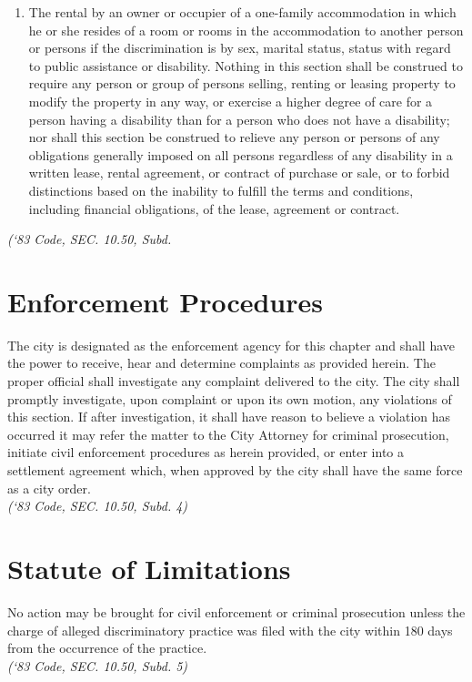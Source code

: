 \begin{enumerate}[{\indent}A)]
\begin{enumerate}
        \item The rental by an owner or occupier of a one-family accommodation in which he or she resides of a room or rooms in the accommodation to another person or persons if the discrimination is by sex, marital status, status with regard to public assistance or disability. Nothing in this section shall be construed to require any person or group of persons selling, renting or leasing property to modify the property in any way, or exercise a higher degree of care for a person having a disability than for a person who does not have a disability; nor shall this section be construed to relieve any person or persons of any obligations generally imposed on all persons regardless of any disability in a written lease, rental agreement, or contract of purchase or sale, or to forbid distinctions based on the inability to fulfill the terms and conditions, including financial obligations, of the lease, agreement or contract.
    \end{enumerate}
\end{enumerate}
\emph{(‘83 Code, SEC. 10.50, Subd.}

\section{Enforcement Procedures}
The city is designated as the enforcement agency for this chapter and shall have the power to receive, hear and determine complaints as provided herein. The proper official shall investigate any complaint delivered to the city. The city shall promptly investigate, upon complaint or upon its own motion, any violations of this section.  If after investigation, it shall have reason to believe a violation has occurred it may refer the matter to the City Attorney for criminal prosecution, initiate civil enforcement procedures as herein provided, or enter into a settlement agreement which, when approved by the city shall have the same force as a city order.\\
\emph{(‘83 Code, SEC. 10.50, Subd. 4)}

\section{Statute of Limitations}
No action may be brought for civil enforcement or criminal prosecution unless the charge of alleged discriminatory practice was filed with the city within 180 days from the occurrence of the practice.\\
\emph{(‘83 Code, SEC. 10.50, Subd. 5)}

